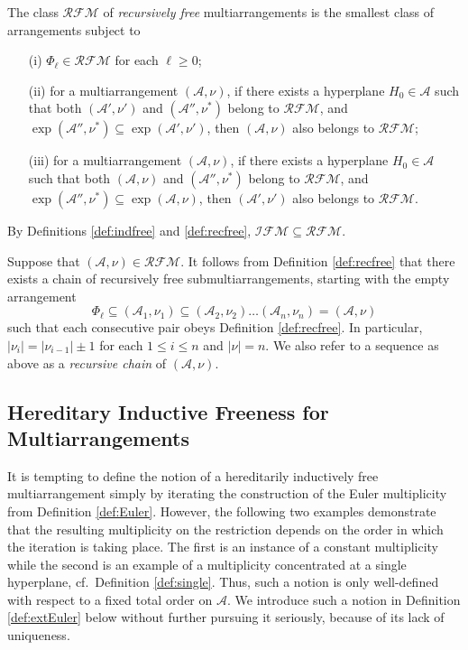 \begin{defn}
\label{def:recfree}
The class ${{\mathcal {RFM}}}$ of \emph{recursively free} multiarrangements 
is the smallest class of arrangements subject to
\begin{itemize}
\item[(i)] $\Phi_\ell \in {{\mathcal {RFM}}}$ for each $\ell \ge 0$;
\item[(ii)] for a multiarrangement $({{\mathcal A}}, \nu)$, if there exists a hyperplane $H_0 \in {{\mathcal A}}$ such that both
$({{\mathcal A}}', \nu')$ and $({{\mathcal A}}'', \nu^*)$ belong to ${{\mathcal {RFM}}}$, and $\exp ({{\mathcal A}}'', \nu^*) \subseteq \exp ({{\mathcal A}}', \nu')$, 
then $({{\mathcal A}}, \nu)$ also belongs to ${{\mathcal {RFM}}}$;
\item[(iii)] 
for a multiarrangement $({{\mathcal A}}, \nu)$, 
if there exists a hyperplane $H_0 \in {{\mathcal A}}$ such that both
$({{\mathcal A}}, \nu)$ and $({{\mathcal A}}'', \nu^*)$ belong to ${{\mathcal {RFM}}}$, and 
$\exp ({{\mathcal A}}'', \nu^*) \subseteq \exp ({{\mathcal A}}, \nu)$, 
then $({{\mathcal A}}', \nu')$ also belongs to ${{\mathcal {RFM}}}$.
\end{itemize}
\end{defn}

By Definitions \ref{def:indfree} and \ref{def:recfree}, 
${{\mathcal {IFM}}} \subseteq {{\mathcal {RFM}}}$.

\begin{remark}
\label{rem:recchain}
Suppose that $({{\mathcal A}}, \nu) \in {{\mathcal {RFM}}}$. 
It follows from Definition \ref{def:recfree} that there exists a chain of 
recursively free submultiarrangements, starting with the 
empty arrangement 
\[
\Phi_\ell \subseteq ({{\mathcal A}}_1, \nu_1) \subseteq ({{\mathcal A}}_2, \nu_2) \ldots ({{\mathcal A}}_n, \nu_n) = ({{\mathcal A}}, \nu) 
\]
such that each consecutive pair obeys Definition \ref{def:recfree}. 
In particular, $|\nu_i| = |\nu_{i-1}| \pm 1$ for each $1 \le i \le n$ and 
$|\nu| = n$.
We also refer to a sequence as above as 
a \emph{recursive chain} of $({{\mathcal A}}, \nu)$. 
\end{remark}

\subsection{Hereditary Inductive Freeness for Multiarrangements}
\label{subsec:heredindutive}
It is tempting to define the notion of a 
hereditarily inductively free multiarrangement simply 
by iterating the construction of the Euler multiplicity
from Definition \ref{def:Euler}.
However, the following two examples demonstrate that 
the resulting multiplicity on the restriction 
depends on the order in which the 
iteration is taking place.
The first is an instance of a constant 
multiplicity while the second is an example 
of a multiplicity concentrated at a single
hyperplane, cf.~Definition \ref{def:single}.
Thus, such a notion is only 
well-defined with respect to a
fixed total order on ${{\mathcal A}}$.
We introduce such a notion 
in Definition \ref{def:extEuler}
below without further pursuing it seriously, 
because of its lack of uniqueness.

